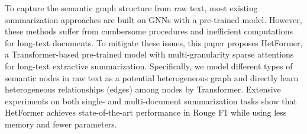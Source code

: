 To capture the semantic graph structure from raw text, most existing summarization approaches are built on GNNs with a pre-trained model. However, these methods suffer from cumbersome procedures and inefficient computations for long-text documents. To mitigate these issues, this paper proposes HetFormer, a Transformer-based pre-trained model with multi-granularity sparse attentions for long-text extractive summarization. Specifically, we model different types of semantic nodes in raw text as a potential heterogeneous graph and directly learn heterogeneous relationships (edges) among nodes by Transformer. Extensive experiments on both single- and multi-document summarization tasks show that HetFormer achieves state-of-the-art performance in Rouge F1 while using less memory and fewer parameters.

